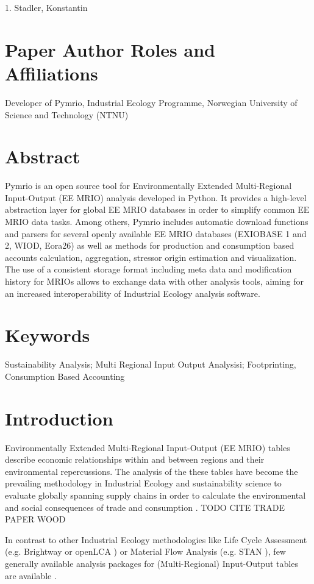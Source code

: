 \documentclass{jors}
\begin{document}
{1. Stadler, Konstantin

\section*{Paper Author Roles and Affiliations}
Developer of Pymrio, Industrial Ecology Programme, Norwegian University of Science and Technology (NTNU)

\section*{Abstract}


Pymrio is an open source tool for Environmentally Extended Multi-Regional Input-Output (EE MRIO) analysis developed in Python.
It provides a high-level abstraction layer for global EE MRIO databases in order to simplify common EE MRIO data tasks. 
Among others, Pymrio includes automatic download functions and parsers for several openly available EE MRIO databases (EXIOBASE 1 and 2, WIOD, Eora26) as well as methods for production and consumption based accounts calculation, aggregation, stressor origin estimation and visualization. 
The use of a consistent storage format including meta data and modification history for MRIOs allows to exchange data with other analysis tools, aiming for an increased interoperability of Industrial Ecology analysis software.

\section*{Keywords}

Sustainability Analysis; Multi Regional Input Output Analysisi; Footprinting, Consumption Based Accounting

\section*{Introduction}

Environmentally Extended Multi-Regional Input-Output (EE MRIO) tables describe economic relationships within and between regions and their environmental repercussions.
The analysis of the these tables have become the prevailing methodology in Industrial Ecology and sustainability science to evaluate globally spanning supply chains in order to calculate the environmental and social consequences of trade and consumption \cite{davis2010a,ivanova2017,tukker2016,verones2015}.
TODO CITE TRADE PAPER WOOD

In contrast to other Industrial Ecology methodologies like 
Life Cycle Assessment (e.g. Brightway \cite{mutel2017} or openLCA \cite{openlca2018})
or Material Flow Analysis (e.g. STAN \cite{cencic2008}), 
few generally available analysis packages for (Multi-Regional) Input-Output tables are available \cite{pauliuk2015}.  

}
\end{document}
